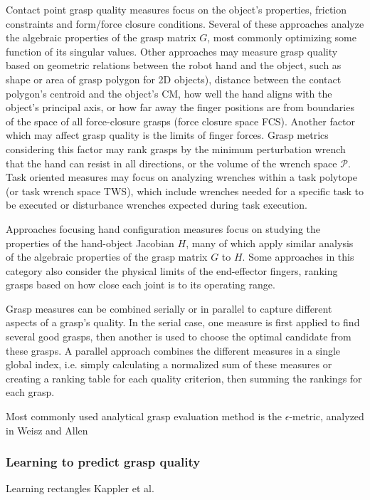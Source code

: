 Contact point grasp quality measures focus on the object's properties, friction constraints and form/force closure
conditions. Several of these approaches analyze the algebraic properties of the grasp matrix $ G $, most commonly
optimizing some function of its singular values. Other approaches may measure grasp quality based on geometric
relations between the robot hand and the object, such as shape or area of grasp polygon for 2D objects), distance
between the contact polygon's centroid and the object's CM, how well the hand aligns with the object's principal axis,
or how far away the finger positions are from boundaries of the space of all force-closure grasps (force closure space
FCS). Another factor which may affect grasp quality is the limits of finger forces. Grasp metrics considering this
factor may rank grasps by the minimum perturbation wrench that the hand can resist in all directions, or the volume of
the wrench space $ \mathcal{P} $. Task oriented measures may focus on analyzing wrenches within a task polytope (or task
wrench space TWS), which include wrenches needed for a specific task to be executed or disturbance wrenches expected
during task execution.

Approaches focusing hand configuration measures focus on studying the properties of the hand-object Jacobian $H$, many
of which apply similar analysis of the algebraic properties of the grasp matrix $ G $ to $ H $. Some approaches in this
category also consider the physical limits of the end-effector fingers, ranking grasps based on how close each joint
is to its operating range.

Grasp measures can be combined serially or in parallel to capture different aspects of a grasp's quality. In the serial
case, one measure is first applied to find several good grasps, then another is used to choose the optimal candidate
from these grasps. A parallel approach combines the different measures in a single global index, i.e. simply
calculating a normalized sum of these measures or creating a ranking table for each quality criterion, then summing the
rankings for each grasp.

Most commonly used analytical grasp evaluation method is the $\epsilon$-metric, analyzed in Weisz and Allen
\cite{WeiszAllen2012} 

\subsubsection*{Learning to predict grasp quality}
Learning rectangles \cite{mahler2017,jiang2011,lenz2015}
Kappler et al. \cite{Kappler2015}

